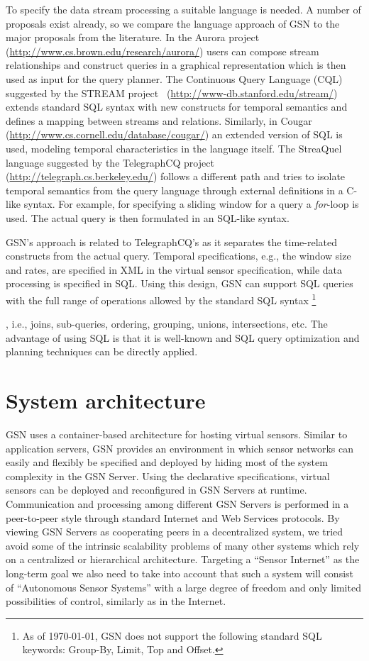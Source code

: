 To specify the data stream processing a suitable language is needed. A number
of proposals exist already, so we compare the language approach of GSN to the
major proposals from the literature. In the Aurora project~\cite{Cherniack03}
(\url{http://www.cs.brown.edu/research/aurora/}) users can compose stream
relationships and construct queries in a graphical representation which is then
used as input for the query planner.  The Continuous Query Language (CQL)
suggested by the STREAM project~\cite{Arasu06}
(\url{http://www-db.stanford.edu/stream/}) extends standard SQL syntax with new
constructs for temporal semantics and defines a mapping between streams and
relations. Similarly, in Cougar~\cite{Yao03}
(\url{http://www.cs.cornell.edu/database/cougar/}) an extended version of SQL
is used, modeling temporal characteristics in the language itself. The
StreaQuel language suggested by the TelegraphCQ project~\cite{Chandrasekaran03}
(\url{http://telegraph.cs.berkeley.edu/}) follows a different path and tries to
isolate temporal semantics from the query language through external definitions
in a C-like syntax. For example, for specifying a sliding window for a query a
\textit{for}-loop is used. The actual query is then formulated in an SQL-like
syntax.

GSN's approach is related to TelegraphCQ's as it separates the
time-related constructs from the actual query. Temporal
specifications, e.g., the window size and rates, are specified in XML in the
virtual sensor specification, while data processing is specified in
SQL. Using this design, GSN can support SQL queries with the full range of
operations allowed by the standard SQL syntax \footnote{As of \today, GSN does not support the following standard SQL keywords: Group-By, Limit, Top and Offset.}

, i.e., joins,
sub-queries, ordering, grouping, unions, intersections, etc.
The advantage of using SQL is that it is well-known and SQL query
optimization and planning techniques can be directly applied.

\section{System architecture}
\label{sec:system-architecture}

GSN uses a container-based architecture for hosting virtual sensors.
Similar to application servers, GSN provides an environment in which
sensor networks can easily and flexibly be specified and deployed by
hiding most of the system complexity in the GSN Server.  Using the
declarative specifications, virtual sensors can be deployed and
reconfigured in GSN Servers at runtime. Communication and
processing among different GSN Servers is performed in a
peer-to-peer style through standard Internet and Web Services protocols. By
viewing GSN Servers as cooperating peers in a decentralized system,
we tried avoid some of the intrinsic scalability problems of many
other systems which rely on a centralized or hierarchical
architecture. Targeting a ``Sensor Internet'' as the long-term goal we
also need to take into account that such a system will consist of
``Autonomous Sensor Systems'' with a large degree of freedom and only
limited possibilities of control, similarly as in the Internet.

